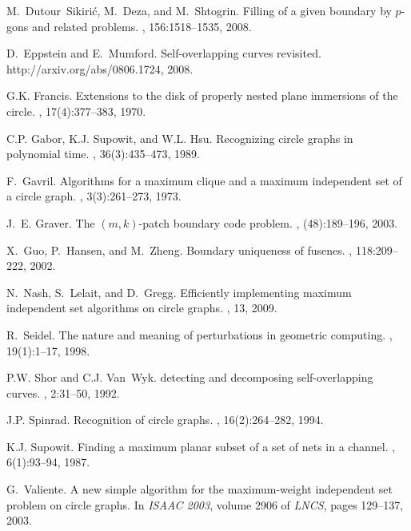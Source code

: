 \documentclass{llncs}
\begin{document}
\begin{thebibliography}{10}
M.~Dutour~Sikiri\'{c}, M.~Deza, and M.~Shtogrin.
\newblock Filling of a given boundary by $p$-gons and related problems.
, 156:1518--1535, 2008.

D.~Eppstein and E.~Mumford.
\newblock Self-overlapping curves revisited.
\newblock http://arxiv.org/abs/0806.1724, 2008.

G.K. Francis.
\newblock Extensions to the disk of properly nested plane immersions of the
  circle.
, 17(4):377--383, 1970.

C.P. Gabor, K.J. Supowit, and W.L. Hsu.
\newblock Recognizing circle graphs in polynomial time.
, 36(3):435--473, 1989.

F.~Gavril.
\newblock Algorithms for a maximum clique and a maximum independent set of a
  circle graph.
, 3(3):261--273, 1973.

J.~E. Graver.
\newblock The {$(m,k)$}-patch boundary code problem.
, (48):189--196, 2003.

X.~Guo, P.~Hansen, and M.~Zheng.
\newblock Boundary uniqueness of fusenes.
, 118:209--222, 2002.

N.~Nash, S.~Lelait, and D.~Gregg.
\newblock Efficiently implementing maximum independent set algorithms on circle
  graphs.
, 13, 2009.

R.~Seidel.
\newblock The nature and meaning of perturbations in geometric computing.
, 19(1):1--17, 1998.

P.W. Shor and C.J. Van~Wyk.
\newblock detecting and decomposing self-overlapping curves.
, 2:31--50, 1992.

J.P. Spinrad.
\newblock Recognition of circle graphs.
, 16(2):264--282, 1994.

K.J. Supowit.
\newblock Finding a maximum planar subset of a set of nets in a channel.
, 6(1):93--94, 1987.

G.~Valiente.
\newblock A new simple algorithm for the maximum-weight independent set problem
  on circle graphs.
\newblock In {\em ISAAC 2003}, volume 2906 of {\em LNCS}, pages 129--137, 2003.

\end{thebibliography}
 
\end{document}
